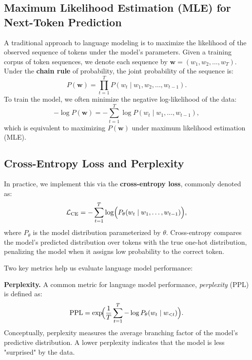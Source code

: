 \subsection{Maximum Likelihood Estimation (MLE) for Next-Token Prediction}
\noindent
A traditional approach to language modeling is to maximize the likelihood of the observed sequence of tokens under the model's parameters. Given a training corpus of token sequences, we denote each sequence by \(\mathbf{w} = (w_1, w_2, \ldots, w_T)\). Under the \textbf{chain rule} of probability, the joint probability of the sequence is:
\[
P(\mathbf{w}) = \prod_{t=1}^{T} P(w_t \mid w_1, w_2, \ldots, w_{t-1}).
\]
To train the model, we often minimize the negative log-likelihood of the data:
\[
-\log P(\mathbf{w}) = -\sum_{t=1}^{T} \log P(w_t \mid w_1, \ldots, w_{t-1}),
\]
which is equivalent to maximizing \(P(\mathbf{w})\) under maximum likelihood estimation (MLE).

\subsection{Cross-Entropy Loss and Perplexity}
\noindent
In practice, we implement this via the \textbf{cross-entropy loss}, commonly denoted as:
\[
\mathcal{L}_\text{CE} = -\sum_{t=1}^{T} \log \Bigl( P_{\theta}(w_t \mid w_1, \ldots, w_{t-1}) \Bigr),
\]
where \(P_{\theta}\) is the model distribution parameterized by \(\theta\). Cross-entropy compares the model's predicted distribution over tokens with the true one-hot distribution, penalizing the model when it assigns low probability to the correct token.

\noindent
Two key metrics help us evaluate language model performance:

\textbf{Perplexity.}
A common metric for language model performance, \emph{perplexity} (PPL) is defined as:
\[
\text{PPL} = \exp\!\Bigl(\frac{1}{T}\sum_{t=1}^T -\log P_{\theta}(w_t \mid w_{<t})\Bigr).
\]
Conceptually, perplexity measures the average branching factor of the model's predictive distribution. A lower perplexity indicates that the model is less "surprised" by the data.

